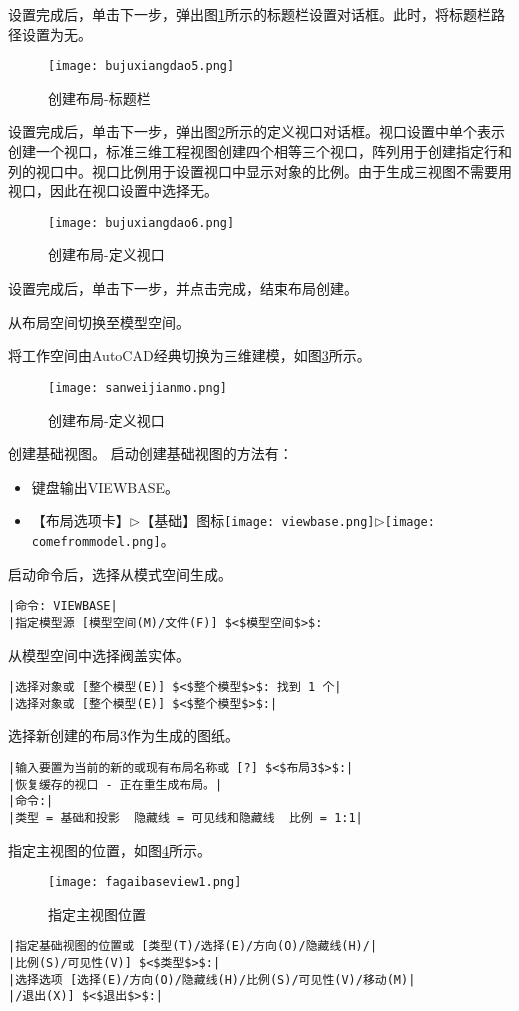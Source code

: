 \begin{procedure}
设置完成后，单击下一步，弹出图\ref{fig:bujuxiangdao5}所示的标题栏设置对话框。此时，将标题栏路径设置为无。
\begin{figure}[htbp]
\centering
\texttt{[image: bujuxiangdao5.png]}
\caption{创建布局-标题栏}\label{fig:bujuxiangdao5}
\end{figure}

设置完成后，单击下一步，弹出图\ref{fig:bujuxiangdao6}所示的定义视口对话框。视口设置中单个表示创建一个视口，标准三维工程视图创建四个相等三个视口，阵列用于创建指定行和列的视口中。视口比例用于设置视口中显示对象的比例。由于生成三视图不需要用视口，因此在视口设置中选择无。

\begin{figure}[htbp]
\centering
\texttt{[image: bujuxiangdao6.png]}
\caption{创建布局-定义视口}\label{fig:bujuxiangdao6}
\end{figure}

设置完成后，单击下一步，并点击完成，结束布局创建。
\item 从布局空间切换至模型空间。
\item 将工作空间由AutoCAD经典切换为三维建模，如图\ref{fig:sanweijianmo}所示。
\begin{figure}[htbp]
\centering
\texttt{[image: sanweijianmo.png]}
\caption{创建布局-定义视口}\label{fig:sanweijianmo}
\end{figure}
\item 创建基础视图。
启动创建基础视图的方法有：
\begin{itemize}
\item 键盘输出VIEWBASE。
\item 【布局选项卡】$\triangleright$【基础】图标\texttt{[image: viewbase.png]}$\triangleright$\texttt{[image: comefrommodel.png]}。
\end{itemize}
\newpage
启动命令后，选择从模式空间生成。
\begin{lstlisting}
|命令: VIEWBASE|
|指定模型源 [模型空间(M)/文件(F)] $<$模型空间$>$:
\end{lstlisting}
从模型空间中选择阀盖实体。
\begin{lstlisting}
|选择对象或 [整个模型(E)] $<$整个模型$>$: 找到 1 个|
|选择对象或 [整个模型(E)] $<$整个模型$>$:|
\end{lstlisting}
选择新创建的布局3作为生成的图纸。
\begin{lstlisting}
|输入要置为当前的新的或现有布局名称或 [?] $<$布局3$>$:|
|恢复缓存的视口 - 正在重生成布局。|
|命令:|
|类型 = 基础和投影  隐藏线 = 可见线和隐藏线  比例 = 1:1|
\end{lstlisting}
指定主视图的位置，如图\ref{fig:fagaibaseview1}所示。
\begin{figure}[htbp]
\centering
\texttt{[image: fagaibaseview1.png]}
\caption{指定主视图位置}\label{fig:fagaibaseview1}
\end{figure}
\begin{lstlisting}
|指定基础视图的位置或 [类型(T)/选择(E)/方向(O)/隐藏线(H)/|
|比例(S)/可见性(V)] $<$类型$>$:|
|选择选项 [选择(E)/方向(O)/隐藏线(H)/比例(S)/可见性(V)/移动(M)|
|/退出(X)] $<$退出$>$:|
\end{lstlisting}


\end{procedure}
